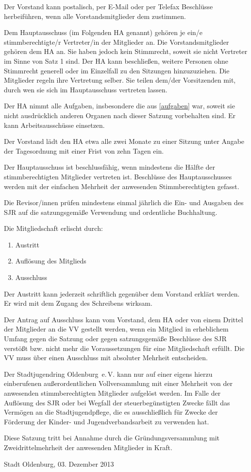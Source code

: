 \documentclass[10pt,a4paper,oneside,parskip=half]{scrartcl}
\begin{document}
\begin{contract}
Der Vorstand kann postalisch, per E-Mail oder per Telefax Beschlüsse herbeiführen, wenn alle Vorstandsmitglieder dem zustimmen.

Dem Hauptausschuss (im Folgenden HA genannt) gehören je ein/e stimmberechtigte/r Vertreter/in der Mitglieder an. Die Vorstandsmitglieder gehören dem HA an. Sie haben jedoch kein Stimmrecht, soweit sie nicht Vertreter im Sinne von Satz 1 sind. Der HA kann beschließen, weitere Personen ohne Stimmrecht generell oder im Einzelfall zu den Sitzungen hinzuzuziehen. Die Mitglieder regeln ihre Vertretung selber. Sie teilen dem/der Vorsitzenden mit, durch wen sie sich im Hauptausschuss vertreten lassen.

Der HA nimmt alle Aufgaben, insbesondere die aus \ref{aufgaben} war, soweit sie nicht ausdrücklich anderen Organen nach dieser Satzung vorbehalten sind. Er kann Arbeitsausschüsse einsetzen.

Der Vorstand lädt den HA etwa alle zwei Monate zu einer Sitzung unter Angabe der Tagesordnung mit einer Frist von zehn Tagen ein.

Der Hauptausschuss ist beschlussfähig, wenn mindestens die Hälfte der stimmberechtigten Mitglieder vertreten ist. Beschlüsse des Hauptausschusses werden mit der einfachen Mehrheit der anwesenden Stimmberechtigten gefasst.

Die Revisor/innen prüfen mindestens einmal jährlich die Ein- und Ausgaben des SJR auf die satzungsgemäße Verwendung und ordentliche Buchhaltung.

\label{mitgliedschaftsende}
Die Mitgliedschaft erlischt durch:
\begin{enumerate}
\item Austritt
\item Auflösung des Mitglieds
\item Ausschluss
\end{enumerate}

Der Austritt kann jederzeit schriftlich gegenüber dem Vorstand erklärt werden. Er wird mit dem Zugang des Schreibens wirksam.

Der Antrag auf Ausschluss kann vom Vorstand, dem HA oder von einem Drittel der Mitglieder an die VV gestellt werden, wenn ein Mitglied in erheblichem Umfang gegen die Satzung oder gegen satzungsgemäße Beschlüsse des SJR verstößt bzw. nicht mehr die Voraussetzungen für eine Mitgliedschaft erfüllt. Die VV muss über einen Ausschluss mit absoluter Mehrheit entscheiden.

Der Stadtjugendring Oldenburg~e.\,V. kann nur auf einer eigens hierzu einberufenen außerordentlichen Vollversammlung mit einer Mehrheit von  der anwesenden stimmberechtigten Mitglieder aufgelöst werden.
Im Falle der Auflösung des SJR oder bei Wegfall der steuerbegünstigten Zwecke fällt das Vermögen an die Stadtjugendpflege, die es ausschließlich für Zwecke der Förderung der Kinder- und Jugendverbandsarbeit zu verwenden hat.

Diese Satzung tritt bei Annahme durch die Gründungsversammlung mit Zweidrittelmehrheit der anwesenden Mitglieder in Kraft.

\end{contract}
\vspace{1cm}
Stadt Oldenburg, 03. Dezember 2013
\end{document}
